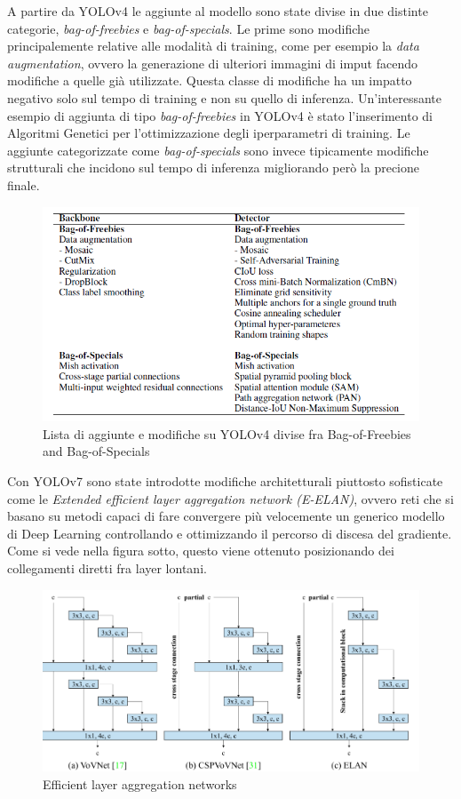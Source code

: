 \documentclass[12pt,a4paper,openright,twoside]{report}
\begin{document}
A partire da YOLOv4 le aggiunte al modello sono state divise in due distinte categorie, \emph{bag-of-freebies} e \emph{bag-of-specials}.
Le prime sono modifiche principalemente relative alle modalità di training, come per esempio la \emph{data augmentation}, ovvero la generazione di ulteriori immagini di imput facendo modifiche a quelle già utilizzate. Questa classe di modifiche ha un impatto negativo solo sul tempo di training e non su quello di inferenza. 
Un'interessante esempio di aggiunta di tipo \emph{bag-of-freebies} in YOLOv4 è stato l'inserimento di Algoritmi Genetici per l'ottimizzazione degli iperparametri di training.
Le aggiunte categorizzate come \emph{bag-of-specials} sono invece tipicamente modifiche strutturali che incidono sul tempo di inferenza migliorando però la precione finale.
\begin{figure}[h]
\centering
\includegraphics[width=\linewidth]{bagofreebies.png}
\caption{Lista di aggiunte e modifiche su YOLOv4 divise fra Bag-of-Freebies and Bag-of-Specials}
\end{figure}
Con YOLOv7 sono state introdotte modifiche architetturali piuttosto sofisticate come le \emph{Extended efficient layer aggregation network (E-ELAN)}, ovvero reti che si basano su metodi capaci di fare convergere più velocemente un generico modello di Deep Learning controllando e ottimizzando il percorso di discesa del gradiente. Come si vede nella figura sotto, questo viene ottenuto posizionando dei collegamenti diretti fra layer lontani.\cite{elan}
\begin{figure}[h]
\centering
\includegraphics[width=\linewidth]{elan.png}
\caption{Efficient layer aggregation networks}
\end{figure}
\end{document}
